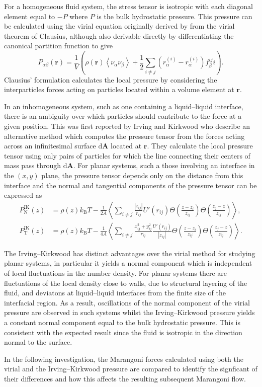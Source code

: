 For a homogeneous fluid system, the stress tensor is isotropic with each diagonal element equal to $- P$ where $P$ is the bulk hydrostatic pressure. 
This pressure can be calculated using the virial equation originally derived by from the virial theorem of Clausius\cite{Clausius}, although also derivable directly by differentiating the canonical partition function\cite{MolTheoryCap} to give
\begin{equation}
\label{VirialPressure}
P_{\alpha \beta}(\mathbf{r})=\frac{1}{V} \left( \rho(\mathbf{r})\left< \nu_{\alpha} \nu_{\beta} \right> + \frac{1}{2} \sum_{i \neq j} (r_{\alpha}^{(i)} - r_{\alpha}^{(i)})f_{\beta}^{ij}i \right).
\end{equation}
Clausius' formulation calculates the local pressure by considering the interparticles forces acting on particles located within a volume element at $\mathbf{r}$.

In an inhomogeneous system, such as one containing a liquid--liquid interface, there is an ambiguity over which particles should contribute to the force at a given position.\cite{MolTheoryCap,VarnikBinder,Rowlinson1982}
This was first reported by Irving and Kirkwood\cite{IrvingKirkwood1949,IrvingKirkwood1950} who describe an alternative method which computes the pressure tensor from the forces acting across an infinitesimal surface $\mathrm{d}\mathbf{A}$ located at $\mathbf{r}$.
They calculate the local pressure tensor using only pairs of particles for which the line connecting their centers of mass pass through $\mathrm{d}\mathbf{A}$.
For planar systems, such a those involving an interface in the $(x,y)$ plane, the pressure tensor depends only on the distance from this interface and the normal and tangential components of the pressure tensor can be expressed as
\begin{align}
\label{IKpressureN}
P_{\mathrm{N}}^{\mathrm{IK}}(z) &= \rho(z)k_{\mathrm{B}}T-\frac{1}{2A} \left< \sum_{i \neq j} \frac{|z_{ij}|}{r_{ij}} U'(r_{ij}) \Theta \left( \frac{z-z_{i}}{z_{ij}}\right) \Theta \left( \frac{z_{j} - z}{z_{ij}} \right) \right>,\\
\label{IKpressureT}
P_{\mathrm{T}}^{\mathrm{IK}}(z) &= \rho(z)k_{\mathrm{B}}T-\frac{1}{4A} \left< \sum_{i \neq j} \frac{x^{2}_{ij} + y^{2}_{ij}}{r_{ij}} \frac{U'(r_{ij})}{|z_{ij}|} \Theta \left( \frac{z-z_{i}}{z_{ij}}\right) \Theta \left( \frac{z_{j} - z}{z_{ij}} \right) \right>.
\end{align}

The Irving--Kirkwood has distinct advantages over the virial method for studying planar systems, in particular it yields a normal component which is independent of local fluctuations in the number density.
For planar systems there are fluctuations of the local density close to walls, due to structural layering of the fluid, and deviatons at liquid--liquid interfaces from the finite size of the interfacial region.
As a result, oscillations of the normal component of the virial pressure are observed in such systems\cite{VarnikBinder} whilst the Irving--Kirkwood pressure yields a constant normal component equal to the bulk hydrostatic pressure.
This is consistent with the expected result since the fluid is isotropic in the direction normal to the surface.

In the following investigation, the Marangoni forces calculated using both the virial and the Irving--Kirkwood pressure are compared to identify the signficant of their differences  and how this affects the resulting subsequent Marangoni flow.
